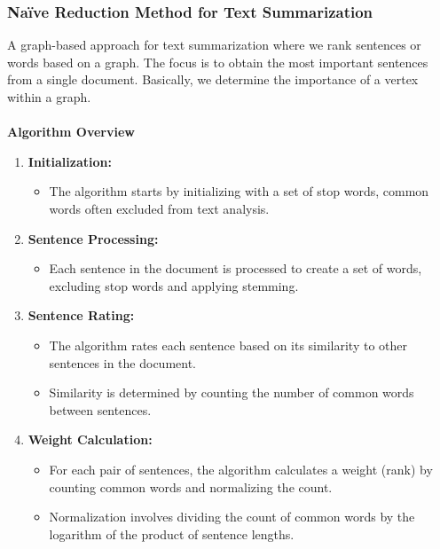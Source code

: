 \documentclass{ieeeaccess}
\begin{document}
\subsubsection{Naïve Reduction Method for Text Summarization}
A graph-based approach for text summarization where we rank sentences or words based on a graph. The focus is to obtain the most important sentences from a single document. Basically, we determine the importance of a vertex within a graph.\\\\
\textbf{Algorithm Overview}\cite{reduction}
\begin{enumerate}
    \item \textbf{Initialization:}
    \begin{itemize}
        \item The algorithm starts by initializing with a set of stop words, common words often excluded from text analysis.
    \end{itemize}
    
    \item \textbf{Sentence Processing:}
    \begin{itemize}
        \item Each sentence in the document is processed to create a set of words, excluding stop words and applying stemming.
    \end{itemize}
    
    \item \textbf{Sentence Rating:}
    \begin{itemize}
        \item The algorithm rates each sentence based on its similarity to other sentences in the document.
        \item Similarity is determined by counting the number of common words between sentences.
    \end{itemize}
    
    \item \textbf{Weight Calculation:}
    \begin{itemize}
        \item For each pair of sentences, the algorithm calculates a weight (rank) by counting common words and normalizing the count.
        \item Normalization involves dividing the count of common words by the logarithm of the product of sentence lengths.
    \end{itemize}


\end{enumerate}
\end{document}
